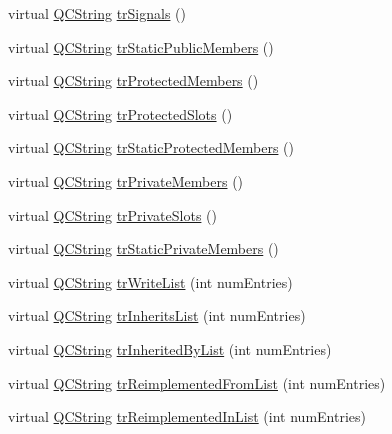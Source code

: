 \begin{DoxyCompactItemize}
\item 
virtual \hyperlink{class_q_c_string}{Q\+C\+String} \hyperlink{class_translator_portuguese_a9f3d61d59c8944ff1cf04c4d931af6b7}{tr\+Signals} ()
\item 
virtual \hyperlink{class_q_c_string}{Q\+C\+String} \hyperlink{class_translator_portuguese_a6bffeb7f1279ab0c23c0e62b2f87e93d}{tr\+Static\+Public\+Members} ()
\item 
virtual \hyperlink{class_q_c_string}{Q\+C\+String} \hyperlink{class_translator_portuguese_a95f5c9579a384ade899136e6453dff00}{tr\+Protected\+Members} ()
\item 
virtual \hyperlink{class_q_c_string}{Q\+C\+String} \hyperlink{class_translator_portuguese_a8f745b6bd11fdfb8211eb76d6b6d1747}{tr\+Protected\+Slots} ()
\item 
virtual \hyperlink{class_q_c_string}{Q\+C\+String} \hyperlink{class_translator_portuguese_afdce03d8f63e0a69e969545953c6e758}{tr\+Static\+Protected\+Members} ()
\item 
virtual \hyperlink{class_q_c_string}{Q\+C\+String} \hyperlink{class_translator_portuguese_a3f1ebf2e5614e0febc237d012aee2a5d}{tr\+Private\+Members} ()
\item 
virtual \hyperlink{class_q_c_string}{Q\+C\+String} \hyperlink{class_translator_portuguese_ae1cd478bcf0754b10d13f900d92363fc}{tr\+Private\+Slots} ()
\item 
virtual \hyperlink{class_q_c_string}{Q\+C\+String} \hyperlink{class_translator_portuguese_a6486d47beb251809cd0cd91f95744834}{tr\+Static\+Private\+Members} ()
\item 
virtual \hyperlink{class_q_c_string}{Q\+C\+String} \hyperlink{class_translator_portuguese_a771f788b30c419b14172504ca0299ce7}{tr\+Write\+List} (int num\+Entries)
\item 
virtual \hyperlink{class_q_c_string}{Q\+C\+String} \hyperlink{class_translator_portuguese_ab6bb422e47718ce45298b9cf1f5088ff}{tr\+Inherits\+List} (int num\+Entries)
\item 
virtual \hyperlink{class_q_c_string}{Q\+C\+String} \hyperlink{class_translator_portuguese_ac930caa238de978d60de05dcb2050233}{tr\+Inherited\+By\+List} (int num\+Entries)
\item 
virtual \hyperlink{class_q_c_string}{Q\+C\+String} \hyperlink{class_translator_portuguese_ac1cc35e342cd1c3e9b97816cb5458917}{tr\+Reimplemented\+From\+List} (int num\+Entries)
\item 
virtual \hyperlink{class_q_c_string}{Q\+C\+String} \hyperlink{class_translator_portuguese_aaf262ebbeb4dc61cf9df31a8f7cd5ff2}{tr\+Reimplemented\+In\+List} (int num\+Entries)

\end{DoxyCompactItemize}
